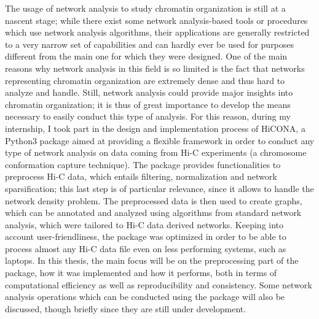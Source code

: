 The usage of network analysis to study chromatin organization is still at a nascent stage; while there exist some network analysis-based tools or procedures which use network analysis algorithms, their applications are generally restricted to a very narrow set of capabilities and can hardly ever be used for purposes different from the main one for which they were designed. One of the main reasons why network analysis in this field is so limited is the fact that networks representing chromatin organization are extremely dense and thus hard to analyze and handle. Still, network analysis could provide major insights into chromatin organization; it is thus of great importance to develop the means necessary to easily conduct this type of analysis. For this reason, during my internship, I took part in the design and implementation process of HiCONA, a Python3 package aimed at providing a flexible framework in order to conduct any type of network analysis on data coming from Hi-C experiments (a chromosome conformation capture technique). The package provides functionalities to preprocess Hi-C data, which entails filtering, normalization and network sparsification; this last step is of particular relevance, since it allows to handle the network density problem. The preprocessed data is then used to create graphs, which can be annotated and analyzed using algorithms from standard network analysis, which were tailored to Hi-C data derived networks. Keeping into account user-friendliness, the package was optimized in order to be able to process almost any Hi-C data file even on less performing systems, such as laptops. In this thesis, the main focus will be on the preprocessing part of the package, how it was implemented and how it performs, both in terms of computational efficiency as well as reproducibility and consistency. Some network analysis operations which can be conducted using the package will also be discussed, though briefly since they are still under development.
